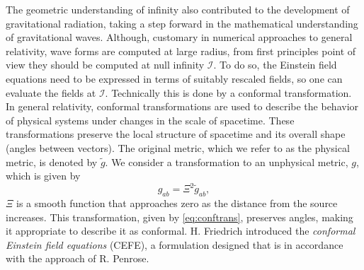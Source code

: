 The geometric understanding of infinity also contributed to the development of gravitational radiation, taking a step forward in the mathematical understanding of gravitational waves. Although, customary in numerical approaches to general relativity, wave forms are computed at large radius, from first principles point of view they should be computed at null infinity $\mathscr{I}$. To do so, the Einstein field equations need to be expressed in terms of suitably rescaled fields, so one can evaluate the fields at $\mathscr{I}$. Technically this is done by a conformal transformation. In general relativity, conformal transformations are used to describe the behavior of physical systems under changes in the scale of spacetime. These transformations preserve the local structure of spacetime and its overall shape (angles between vectors). The original metric, which we refer to as the physical metric, is denoted by $\tilde{g}$. We consider a transformation to an unphysical metric, $g$, which is given by 
\begin{equation}\label{eq:conftrans}
	g_{ab} = \Xi^2 \tilde{g}_{ab},
\end{equation}
$\Xi$ is a smooth function that approaches zero as the distance from the source increases. This transformation, given by \eqref{eq:conftrans}, preserves angles, making it appropriate to describe it as conformal. H. Friedrich introduced the \textit{conformal Einstein field
equations} (CEFE), a formulation designed that is in accordance with
the approach of R. Penrose.
\medskip

